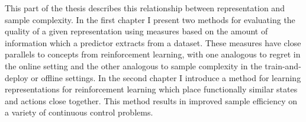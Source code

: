 



This part of the thesis describes this relationship between representation and sample complexity.
In the first chapter I present two methods for evaluating the quality of a given representation using measures based on the amount of information which a predictor extracts from a dataset.
These measures have close parallels to concepts from reinforcement learning, with one analogous to regret in the online setting and the other analogous to sample complexity in the train-and-deploy or offline settings.
In the second chapter I introduce a method for learning representations for reinforcement learning which place functionally similar states and actions close together.
This method results in improved sample efficiency on a variety of continuous control problems.
